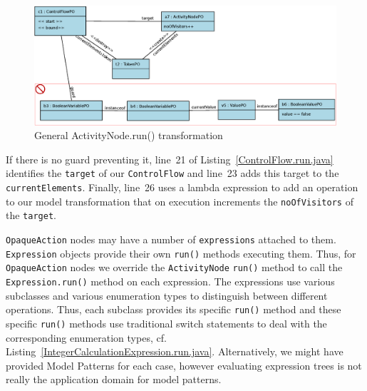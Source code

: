 \documentclass[submission,copyright,creativecommons]{eptcs}
\begin{document}
\begin{figure}[ht] \centering
	\includegraphics[width=\linewidth]{images/ControlFlow.run.eps}
 \caption{General ActivityNode.run() transformation}
 \label{fig:ControlFlow.run}
\end{figure}

If there is no guard preventing it, line~21 of Listing~\ref{ControlFlow.run.java} identifies the \texttt{target} of our \texttt{ControlFlow} and line~23 adds this target to the \texttt{currentElements}. Finally, line~26 uses a lambda expression to add an operation to our model transformation that on execution increments the \texttt{noOfVisitors} of the \texttt{target}. 

\texttt{OpaqueAction} nodes may have a number of \texttt{expressions} attached to them. \texttt{Expression} objects provide their own \texttt{run()} methods executing them. Thus, for \texttt{OpaqueAction} nodes we override the \texttt{ActivityNode} \texttt{run()} method to call the \texttt{Expression.run()} method on each expression. The expressions use various subclasses and various enumeration types to distinguish between different operations. Thus, each subclass provides its specific \texttt{run()} method and these specific \texttt{run()} methods use traditional switch statements to deal with the corresponding enumeration types, cf. Listing~\ref{IntegerCalculationExpression.run.java}. Alternatively, we might have provided Model Patterns for each case, however evaluating expression trees is not really the application domain for model patterns. 
\end{document}
